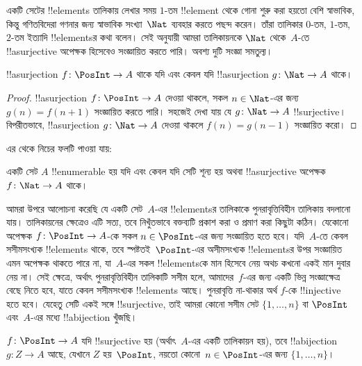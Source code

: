 \documentclass[../../../include/open-logic-section]{subfiles}
\begin{document}
একটি সেটের !!{element}s তালিকায় লেখার সময় $1$-তম !!{element} থেকে গোনা শুরু করা হয়তো বেশি স্বাভাবিক, কিন্তু গণিতবিদেরা গণনার জন্য স্বাভাবিক সংখ্যা~$\Nat$ ব্যবহার করতে পছন্দ করেন। তাঁরা তালিকার $0$-তম, $1$-তম, $2$-তম ইত্যাদি !!{element}sর কথা বলেন। সেই অনুযায়ী আমরা তালিকায়নকে $\Nat$ থেকে~$A$-তে !!a{surjective} অপেক্ষক হিসেবেও সংজ্ঞায়িত করতে পারি। অবশ্য দুটি সংজ্ঞা সমতুল্য।

\begin{prop}
  !!a{surjection} $f\colon \PosInt \to A$ থাকে যদি এবং কেবল যদি !!a{surjection} $g\colon \Nat \to A$ থাকে।
\end{prop}

\begin{proof}
  !!a{surjection} $f\colon \PosInt \to A$ দেওয়া থাকলে, সকল $n \in \Nat$-এর জন্য $g(n) =
  f(n+1)$ সংজ্ঞায়িত করতে পারি। সহজেই দেখা যায় যে $g\colon \Nat
  \to A$ !!{surjective}। বিপরীতভাবে, !!a{surjection} $g\colon
  \Nat \to A$ দেওয়া থাকলে $f(n) = g(n-1)$ সংজ্ঞায়িত করো।
\end{proof}

এর থেকে নিচের ফলটি পাওয়া যায়:

\begin{cor}
একটি সেট $A$ !!{enumerable} হয় যদি এবং কেবল যদি সেটি শূন্য হয় অথবা !!a{surjective} অপেক্ষক $f\colon \Nat \to A$ থাকে।
\end{cor}

আমরা উপরে আলোচনা করেছি যে একটি সেট~$A$-এর !!{element}sর তালিকাকে পুনরাবৃত্তিবিহীন তালিকায় বদলানো যায়। তালিকায়নের ক্ষেত্রেও এটি সত্য, তবে নিখুঁতভাবে বক্তব্যটি প্রকাশ করা ও প্রমাণ করা কিছুটা কঠিন। যেকোনো অপেক্ষক $f\colon \PosInt \to A$-কে সকল $n \in
\PosInt$-এর জন্য সংজ্ঞায়িত হতে হবে। যদি~$A$-তে কেবল সসীমসংখ্যক !!{element}s থাকে, তবে স্পষ্টতই~$\PosInt$-এর অসীমসংখ্যক !!{element}sর উপর সংজ্ঞায়িত এমন অপেক্ষক থাকতে পারে না, যা~$A$-এর সকল !!{element}sকে মান হিসেবে নেয় অথচ কখনো একই মান দুবার নেয় না। সেই ক্ষেত্রে, অর্থাৎ পুনরাবৃত্তিবিহীন তালিকাটি সসীম হলে, আমাদের~$f$-এর জন্য একটি ভিন্ন সংজ্ঞাক্ষেত্র বেছে নিতে হবে, যাতে কেবল সসীমসংখ্যক !!{element}s আছে। পুনরাবৃত্তি না-থাকার অর্থ $f$-কে !!{injective} হতে হবে। যেহেতু সেটি একই সঙ্গে !!{surjective}, তাই আমরা কোনো সসীম সেট $\{1, \dots, n\}$ বা $\PosInt$ এবং~$A$-এর মধ্যে !!a{bijection} খুঁজছি।

\begin{prop}
$f\colon \PosInt \to A$ যদি !!{surjective} হয় (অর্থাৎ~$A$-এর একটি তালিকায়ন হয়), তবে !!a{bijection} $g\colon Z \to A$ আছে, যেখানে $Z$ হয়~$\PosInt$, নয়তো কোনো~$n \in \PosInt$-এর জন্য $\{1, \dots, n\}$।
\end{prop}
\end{document}
